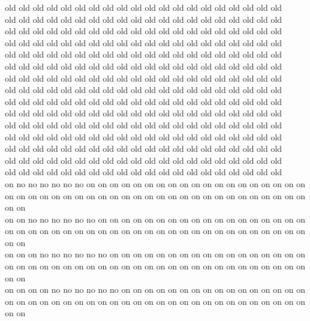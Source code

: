 old old old old old old old old old old old old old old old old old old old old\\
old old old old old old old old old old old old old old old old old old old old\\
old old old old old old old old old old old old old old old old old old old old\\
old old old old old old old old old old old old old old old old old old old old\\
old old old old old old old old old old old old old old old old old old old old\\
old old old old old old old old old old old old old old old old old old old old\\
old old old old old old old old old old old old old old old old old old old old\\
old old old old old old old old old old old old old old old old old old old old\\
old old old old old old old old old old old old old old old old old old old old\\
old old old old old old old old old old old old old old old old old old old old\\
old old old old old old old old old old old old old old old old old old old old\\
old old old old old old old old old old old old old old old old old old old old\\
old old old old old old old old old old old old old old old old old old old old\\
old old old old old old old old old old old old old old old old old old old old\\
old old old old old old old old old old old old old old old old old old old old\\
on no no no no no no on on on on on on on on on on on on on on on on on on on on on on on on on on on on on on on on on on on on on on on on on on on on on on on\\
on on no no no no no no on on on on on on on on on on on on on on on on on on on on on on on on on on on on on on on on on on on on on on on on on on on on on on\\
on on on no no no no no no on on on on on on on on on on on on on on on on on on on on on on on on on on on on on on on on on on on on on on on on on on on on on\\
on on on on no no no no no no on on on on on on on on on on on on on on on on on on on on on on on on on on on on on on on on on on on on on on on on on on on on\\
